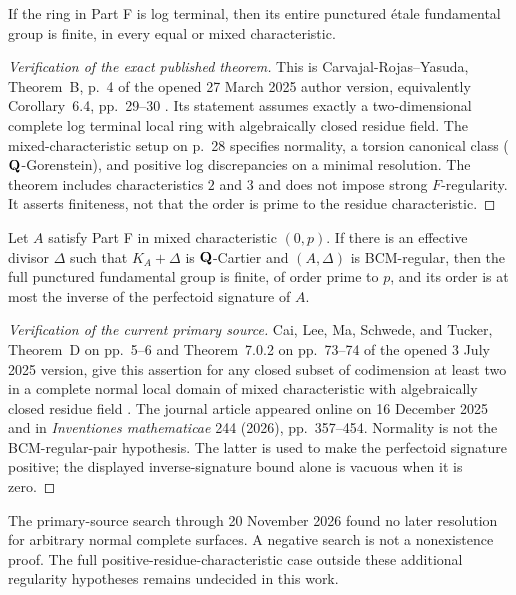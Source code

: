 \begin{proposition}
If the ring in Part F is log terminal, then its entire punctured
\'etale fundamental group is finite, in every equal or mixed
characteristic.
\end{proposition}
\begin{proof}[Verification of the exact published theorem]
This is Carvajal-Rojas--Yasuda, Theorem~B, p.~4 of the opened
27 March 2025 author version, equivalently Corollary~6.4,
pp.~29--30 \cite{CarvajalYasuda2025}. Its statement assumes exactly
a two-dimensional complete log terminal local ring with
algebraically closed residue field. The mixed-characteristic
setup on p.~28 specifies normality, a torsion canonical class
($\mathbf Q$-Gorenstein), and positive log discrepancies on a minimal
resolution. The theorem includes characteristics $2$ and $3$ and
does not impose strong $F$-regularity. It asserts finiteness, not
that the order is prime to the residue characteristic.
\end{proof}

\begin{proposition}
Let $A$ satisfy Part F in mixed characteristic $(0,p)$. If there is an
effective divisor $\Delta$ such that $K_A+\Delta$ is $\mathbf Q$-Cartier
and $(A,\Delta)$ is BCM-regular, then the full punctured fundamental
group is finite, of order prime to $p$, and its order is at most the
inverse of the perfectoid signature of $A$.
\end{proposition}
\begin{proof}[Verification of the current primary source]
Cai, Lee, Ma, Schwede, and Tucker, Theorem~D on pp.~5--6 and
Theorem~7.0.2 on pp.~73--74 of the opened 3 July 2025 version,
give this assertion for any closed subset of codimension at least
two in a complete normal local domain of mixed characteristic with
algebraically closed residue field \cite{CaiEtAl2026}.
The journal article appeared online on 16 December 2025 and in
\emph{Inventiones mathematicae} 244 (2026), pp.~357--454.
Normality is not the BCM-regular-pair hypothesis. The latter is
used to make the perfectoid signature positive; the displayed
inverse-signature bound alone is vacuous when it is zero.
\end{proof}

The primary-source search through 20 November 2026 found no later
resolution for arbitrary normal complete surfaces. A negative search is not a
nonexistence proof. The full positive-residue-characteristic case
outside these additional regularity hypotheses remains
undecided in this work.

